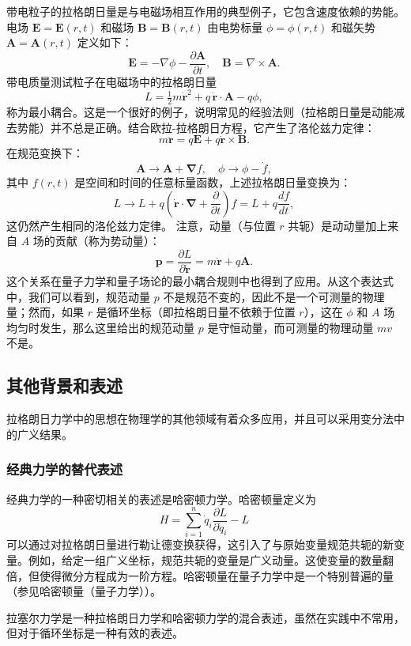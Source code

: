 带电粒子的拉格朗日量是与电磁场相互作用的典型例子，它包含速度依赖的势能。电场 \( \mathbf{E} = \mathbf{E}(r, t) \) 和磁场 \( \mathbf{B} = \mathbf{B}(r, t) \) 由电势标量 \( \phi = \phi(r, t) \) 和磁矢势 \( \mathbf{A} = \mathbf{A}(r, t) \) 定义如下：
\[
\mathbf{E} = -\nabla \phi - \frac{\partial \mathbf{A}}{\partial t}, \quad \mathbf{B} = \nabla \times \mathbf{A}.~
\]
带电质量测试粒子在电磁场中的拉格朗日量
\[
L={\tfrac {1}{2}}m{\dot {\mathbf {r}}}^{2}+q\,{\dot {\mathbf {r}}}\cdot \mathbf {A} -q\phi,~
\]
称为最小耦合。这是一个很好的例子，说明常见的经验法则（拉格朗日量是动能减去势能）并不总是正确。结合欧拉-拉格朗日方程，它产生了洛伦兹力定律：
\[
m{\ddot {\mathbf {r}}}=q\mathbf {E} +q{\dot {\mathbf {r}}}\times \mathbf {B}.~
\]
在规范变换下：
\[
\mathbf {A} \rightarrow \mathbf {A} +{\boldsymbol {\nabla }}f,\quad \phi \rightarrow \phi -{\dot {f}},~
\]
其中 \( f(r,t) \) 是空间和时间的任意标量函数，上述拉格朗日量变换为：
\[
L\rightarrow L+q\left({\dot {\mathbf {r}}}\cdot {\boldsymbol {\nabla }}+{\frac {\partial }{\partial t}}\right)f=L+q{\frac {df}{dt}},~
\]
这仍然产生相同的洛伦兹力定律。
注意，动量（与位置 \( r \) 共轭）是动动量加上来自 \( A \) 场的贡献（称为势动量）：
\[
\mathbf {p} =\frac {\partial L}{\partial {\dot {\mathbf {r}}}}=m{\dot {\mathbf {r}}}+q\mathbf {A} .~
\]
这个关系在量子力学和量子场论的最小耦合规则中也得到了应用。从这个表达式中，我们可以看到，规范动量 \( p \) 不是规范不变的，因此不是一个可测量的物理量；然而，如果 \( r \) 是循环坐标（即拉格朗日量不依赖于位置 \( r \)），这在 \( \phi \) 和 \( A \) 场均匀时发生，那么这里给出的规范动量 \( p \) 是守恒动量，而可测量的物理动量 \( mv \) 不是。
\subsection{其他背景和表述}
拉格朗日力学中的思想在物理学的其他领域有着众多应用，并且可以采用变分法中的广义结果。
\subsubsection{经典力学的替代表述}
经典力学的一种密切相关的表述是哈密顿力学。哈密顿量定义为
\[
H = \sum_{i=1}^{n} \dot{q}_{i} \frac{\partial L}{\partial \dot{q}_{i}} - L~
\]
可以通过对拉格朗日量进行勒让德变换获得，这引入了与原始变量规范共轭的新变量。例如，给定一组广义坐标，规范共轭的变量是广义动量。这使变量的数量翻倍，但使得微分方程成为一阶方程。哈密顿量在量子力学中是一个特别普遍的量（参见哈密顿量（量子力学））。

拉塞尔力学是一种拉格朗日力学和哈密顿力学的混合表述，虽然在实践中不常用，但对于循环坐标是一种有效的表述。
